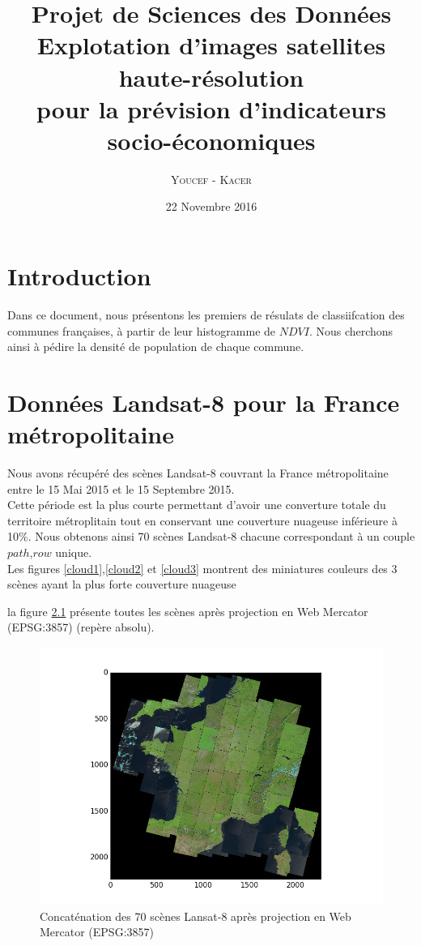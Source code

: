 \documentclass{book}
\title{%
  Projet de Sciences des Données \\
  \large Explotation d'images satellites haute-résolution \\pour la prévision d'indicateurs socio-économiques \\
    }
\author{\textsc{Youcef} - \textsc{Kacer}}
\date{22 Novembre 2016}
\begin{document}
 
\maketitle

\tableofcontents

\frontmatter
\chapter{Introduction}
Dans ce document, nous présentons les premiers de résulats de classiifcation des communes françaises, à partir de leur histogramme de $NDVI$. Nous cherchons ainsi à pédire
la densité de population de chaque commune. 

\mainmatter
\chapter{Données Landsat-8 pour la France métropolitaine}

Nous avons récupéré des scènes Landsat-8 couvrant la France métropolitaine entre le 15 Mai 2015 et le 15 Septembre 2015.\\
Cette période est la plus courte permettant d'avoir une converture totale du territoire métroplitain tout en conservant une couverture nuageuse inférieure à 10\%.
Nous obtenons ainsi 70 scènes Landsat-8 chacune correspondant à un couple $path$,$row$ unique.\\
Les figures \ref{cloud1},\ref{cloud2} et \ref{cloud3} montrent des miniatures couleurs des 3 scènes ayant la plus forte couverture nuageuse

la figure \ref{couverture} présente toutes les scènes après projection en Web Mercator (EPSG:3857) (repère absolu).

\begin{figure}
\begin{center}
\includegraphics[scale=0.6]{images/france-covering.png}
\end{center}
\caption{Concaténation des 70 scènes Lansat-8 après projection en Web Mercator (EPSG:3857)}
\label{couverture}
\end{figure}
\clearpage
\end{document}
